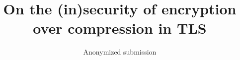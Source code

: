 \documentclass[letterpaper,twocolumn,10pt]{article}
\begin{document}
\title{On the (in)security of encryption over compression in TLS}

\author{
    Anonymized submission
}

\maketitle

\thispagestyle{empty}

















\end{document}
